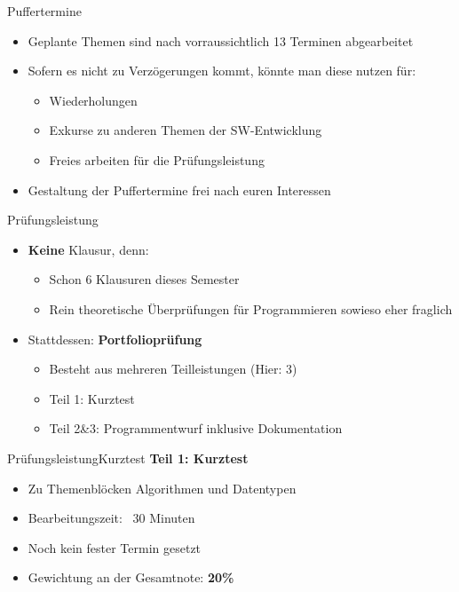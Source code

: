 \begin{frame}{Puffertermine}{}
	\begin{itemize}
		\item Geplante Themen sind nach vorraussichtlich 13 Terminen abgearbeitet
		\item Sofern es nicht zu Verzögerungen kommt, könnte man diese nutzen für:
		\begin{itemize}
			\item Wiederholungen
			\item Exkurse zu anderen Themen der SW-Entwicklung
			\item Freies arbeiten für die Prüfungsleistung
		\end{itemize}
		\item Gestaltung der Puffertermine frei nach euren Interessen
	\end{itemize}
\end{frame}

\begin{frame}{Prüfungsleistung}{}
	\begin{itemize}
	\item \textbf{Keine} Klausur, denn:
		\begin{itemize}
			\item Schon 6 Klausuren dieses Semester
			\item Rein theoretische Überprüfungen für Programmieren sowieso eher fraglich
		\end{itemize}
	\item Stattdessen: \textbf{Portfolioprüfung}
		\begin{itemize}
			\item Besteht aus mehreren Teilleistungen (Hier: 3)
			\item Teil 1: Kurztest
			\item Teil 2\&3: Programmentwurf inklusive Dokumentation 
		\end{itemize}
	\end{itemize}
\end{frame}

\begin{frame}{Prüfungsleistung}{Kurztest}
	\textbf{Teil 1: Kurztest}
	\begin{itemize}
		\item Zu Themenblöcken Algorithmen und Datentypen
		\item Bearbeitungszeit: ~30 Minuten
		\item Noch kein fester Termin gesetzt
		\item Gewichtung an der Gesamtnote: \textbf{20\%}
	\end{itemize}
\end{frame}

